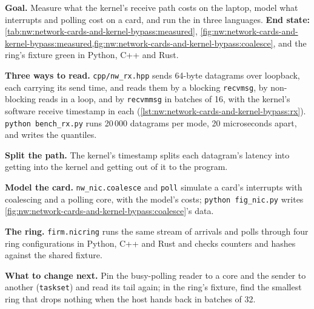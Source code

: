 \begin{tutorial}
\textbf{Goal.} Measure what the kernel's receive path costs on the laptop, model what interrupts and polling cost on a card, and run
the  in three languages. \textbf{End state:} \cref{tab:nw:network-cards-and-kernel-bypass:measured},
\cref{fig:nw:network-cards-and-kernel-bypass:measured,fig:nw:network-cards-and-kernel-bypass:coalesce}, and the ring's fixture green in
Python, C++ and Rust.
\begin{tutsteps}
\item \textbf{Three ways to read.} \texttt{cpp/nw\_rx.hpp} sends 64-byte datagrams over loopback, each carrying its send time, and reads
  them by a blocking \texttt{recvmsg}, by non-blocking reads in a loop, and by \texttt{recvmmsg} in batches of 16, with the kernel's software
  receive timestamp in each (\cref{lst:nw:network-cards-and-kernel-bypass:rx}). \texttt{python bench\_rx.py} runs 20\,000 datagrams per
  mode, 20 microseconds apart, and writes the quantiles.
\item \textbf{Split the path.} The kernel's timestamp splits each datagram's latency into getting into the kernel and getting out of it
  to the program.
\item \textbf{Model the card.} \texttt{nw\_nic.coalesce} and \texttt{poll} simulate a card's interrupts with coalescing and a polling
  core, with the model's costs; \texttt{python fig\_nic.py} writes \cref{fig:nw:network-cards-and-kernel-bypass:coalesce}'s data.
\item \textbf{The ring.} \texttt{firm.nicring} runs the same stream of arrivals and polls through four ring configurations in Python,
  C++ and Rust and checks counters and hashes against the shared fixture.
\end{tutsteps}
\textbf{What to change next.} Pin the busy-polling reader to a core and the sender to another (\texttt{taskset}) and read its tail
again; in the ring's fixture, find the smallest ring that drops nothing when the host hands back in batches of 32.
\end{tutorial}

\label{lst:nw:network-cards-and-kernel-bypass:rx}

